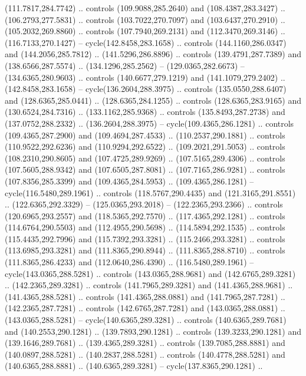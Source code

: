 \begin{scope}[cm={{1.25,0.0,0.0,-1.25,(0.0,743.43331)}}]
    (111.7817,284.7742) .. controls (109.9088,285.2640) and (108.4387,283.3427) ..
    (106.2793,277.5831) .. controls (103.7022,270.7097) and (103.6437,270.2910) ..
    (105.2032,269.8860) .. controls (107.7940,269.2131) and (112.3470,269.3146) ..
    (116.7133,270.1427) -- cycle(142.8458,283.1658) .. controls
    (144.1160,286.0347) and (144.2056,285.7812) .. (141.5296,286.8896) .. controls
    (139.4791,287.7389) and (138.6566,287.5574) .. (134.1296,285.2562) --
    (129.0365,282.6673) -- (134.6365,280.9603) .. controls (140.6677,279.1219) and
    (141.1079,279.2402) .. (142.8458,283.1658) -- cycle(136.2604,288.3975) ..
    controls (135.0550,288.6407) and (128.6365,285.0441) .. (128.6365,284.1255) ..
    controls (128.6365,283.9165) and (130.6524,284.7316) .. (133.1162,285.9368) ..
    controls (135.8493,287.2738) and (137.0752,288.2332) .. (136.2604,288.3975) --
    cycle(109.4365,286.1281) .. controls (109.4365,287.2900) and
    (109.4694,287.4533) .. (110.2537,290.1881) .. controls (110.9522,292.6236) and
    (110.9294,292.6522) .. (109.2021,291.5053) .. controls (108.2310,290.8605) and
    (107.4725,289.9269) .. (107.5165,289.4306) .. controls (107.5605,288.9342) and
    (107.6505,287.8081) .. (107.7165,286.9281) .. controls (107.8356,285.3399) and
    (109.4365,284.5953) .. (109.4365,286.1281) -- cycle(116.5480,289.1961) ..
    controls (118.5767,290.4435) and (121.3165,291.8551) .. (122.6365,292.3329) --
    (125.0365,293.2018) -- (122.2365,293.2366) .. controls (120.6965,293.2557) and
    (118.5365,292.7570) .. (117.4365,292.1281) .. controls (114.6764,290.5503) and
    (112.4955,290.5698) .. (114.5894,292.1535) .. controls (115.4435,292.7996) and
    (115.7392,293.3281) .. (115.2466,293.3281) .. controls (113.6985,293.3281) and
    (111.8365,290.8944) .. (111.8365,288.8710) .. controls (111.8365,286.4233) and
    (112.0640,286.4390) .. (116.5480,289.1961) -- cycle(143.0365,288.5281) ..
    controls (143.0365,288.9681) and (142.6765,289.3281) .. (142.2365,289.3281) ..
    controls (141.7965,289.3281) and (141.4365,288.9681) .. (141.4365,288.5281) ..
    controls (141.4365,288.0881) and (141.7965,287.7281) .. (142.2365,287.7281) ..
    controls (142.6765,287.7281) and (143.0365,288.0881) .. (143.0365,288.5281) --
    cycle(140.6365,289.3281) .. controls (140.6365,289.7681) and
    (140.2553,290.1281) .. (139.7893,290.1281) .. controls (139.3233,290.1281) and
    (139.1646,289.7681) .. (139.4365,289.3281) .. controls (139.7085,288.8881) and
    (140.0897,288.5281) .. (140.2837,288.5281) .. controls (140.4778,288.5281) and
    (140.6365,288.8881) .. (140.6365,289.3281) -- cycle(137.8365,290.1281) ..

\end{scope}
